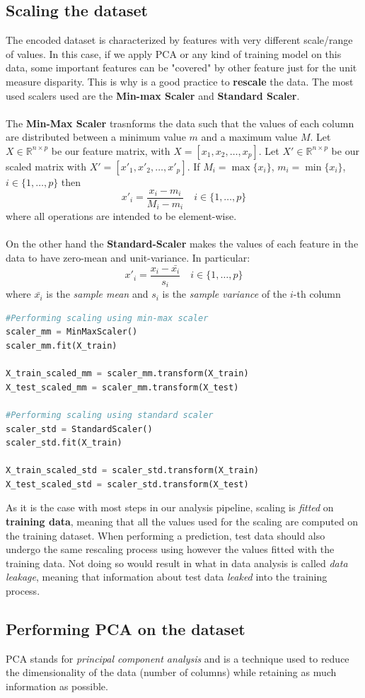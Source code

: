 \subsection{Scaling the dataset}

The encoded dataset is characterized by features with very different scale/range  of values. In this case, if we apply PCA or any kind of training model on this data, some important features can be "covered" by other feature just for the unit measure disparity. This is why is a good practice to \textbf{rescale} the data. The most used scalers used are the \textbf{Min-max Scaler} and \textbf{Standard Scaler}.\\
\\
The \textbf{Min-Max Scaler} trasnforms the data such that the values of each column are distributed between a minimum value $m$ and a maximum value $M$. Let $X \in \mathbb{R}^{n \times p}$ be our feature matrix, with $X=[x_1, x_2, \dots, x_p]$. Let $X' \in \mathbb{R}^{n \times p}$ be our scaled matrix with $X'=[x'_1, x'_2, \dots, x'_p]$. If $M_i = \max\{x_i\}$, $m_i = \min\{x_i\}$, $i \in \{1,  \dots,  p\}$ then
\begin{equation}
    x'_i = \frac{x_i - m_i}{M_i-m_i} \quad i \in \{1,  \dots,  p\}    
\end{equation}
where all operations are intended to be element-wise. \\
\\
On the other hand the \textbf{Standard-Scaler} makes the values of each feature in the data to have zero-mean and unit-variance. In particular: 
\begin{equation}
    x'_i = \frac{x_i - \bar{x_i}}{s_i} \quad i \in \{1,  \dots,  p\}    
\end{equation}
where $\bar{x_i}$ is the \textit{sample mean} and $s_i$ is the \textit{sample variance} of the $i$-th column
\begin{lstlisting}[language=Python, caption= Data scaling]
#Performing scaling using min-max scaler
scaler_mm = MinMaxScaler()
scaler_mm.fit(X_train)

X_train_scaled_mm = scaler_mm.transform(X_train)
X_test_scaled_mm = scaler_mm.transform(X_test)

#Performing scaling using standard scaler
scaler_std = StandardScaler()
scaler_std.fit(X_train)

X_train_scaled_std = scaler_std.transform(X_train)
X_test_scaled_std = scaler_std.transform(X_test)
\end{lstlisting}
As it is the case with most steps in our analysis pipeline, scaling is \textit{fitted} on \textbf{training data}, meaning that all the values used for the scaling are computed on the training dataset. When performing a prediction, test data should also undergo the same rescaling process using however the values fitted with the training data. Not doing so would result in what in data analysis is called \textit{data leakage}, meaning that information about test data \textit{leaked} into the training process.

\subsection{Performing PCA on the dataset}
PCA stands for \textit{principal component analysis} and is a technique used to reduce the dimensionality of the data (number of columns) while retaining as much information as possible.